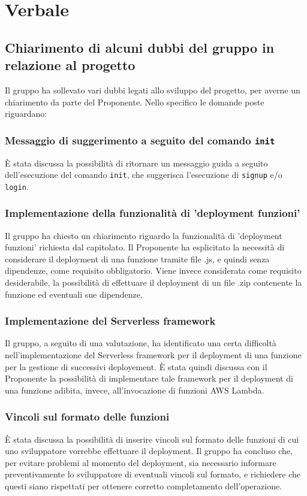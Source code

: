\section{Verbale}
\subsection{Chiarimento di alcuni dubbi del gruppo in relazione al progetto}
Il gruppo ha sollevato vari dubbi legati allo sviluppo del progetto, per averne un chiarimento da parte del Proponente. Nello specifico le domande poste riguardano:
\subsubsection*{Messaggio di suggerimento a seguito del comando \texttt{init}}
È stata discussa la possibilità di ritornare un messaggio guida a seguito dell'esecuzione del comando \texttt{init}, che suggerisca l'esecuzione di \texttt{signup} e/o \texttt{login}.
\subsubsection*{Implementazione della funzionalità di 'deployment funzioni'}
Il gruppo ha chiesto un chiarimento riguardo la funzionalità di 'deployment funzioni' richiesta dal capitolato. Il Proponente ha esplicitato la necessità di considerare il deployment di una funzione tramite file .js, e quindi senza dipendenze, come requisito obbligatorio. Viene invece considerata come requisito desiderabile, la possibilità di effettuare il deployment di un file .zip contenente la funzione ed eventuali sue dipendenze.
\subsubsection*{Implementazione del Serverless framework}
Il gruppo, a seguito di una valutazione, ha identificato una certa difficoltà nell'implementazione del Serverless framework per il deployment di una funzione per la gestione di successivi deployement. È stata quindi discussa con il Proponente la possibilità di implementare tale framework per il deployment di una funzione adibita, invece, all'invocazione di funzioni AWS Lambda.
\subsubsection*{Vincoli sul formato delle funzioni}
È stata discussa la possibilità di inserire vincoli sul formato delle funzioni di cui uno sviluppatore vorrebbe effettuare il deployment. Il gruppo ha concluso che, per evitare problemi al momento del deployment, sia necessario informare preventivamente lo sviluppatore di eventuali vincoli sul formato, e richiedere che questi siano rispettati per ottenere corretto completamento dell'operazione.
